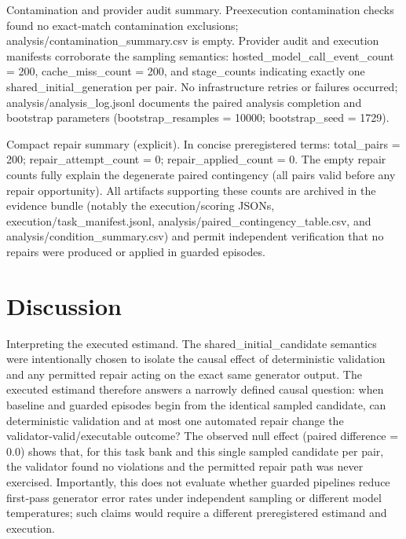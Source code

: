 \documentclass[conference]{IEEEtran}
\begin{document}
Contamination and provider audit summary. Preexecution contamination checks found no exact‑match contamination exclusions; analysis/contamination\_summary.csv is empty. Provider audit and execution manifests corroborate the sampling semantics: hosted\_model\_call\_event\_count = 200, cache\_miss\_count = 200, and stage\_counts indicating exactly one shared\_initial\_generation per pair. No infrastructure retries or failures occurred; analysis/analysis\_log.jsonl documents the paired analysis completion and bootstrap parameters (bootstrap\_resamples = 10000; bootstrap\_seed = 1729).

Compact repair summary (explicit). In concise preregistered terms: total\_pairs = 200; repair\_attempt\_count = 0; repair\_applied\_count = 0. The empty repair counts fully explain the degenerate paired contingency (all pairs valid before any repair opportunity). All artifacts supporting these counts are archived in the evidence bundle (notably the execution/scoring JSONs, execution/task\_manifest.jsonl, analysis/paired\_contingency\_table.csv, and analysis/condition\_summary.csv) and permit independent verification that no repairs were produced or applied in guarded episodes.

\section{Discussion}
Interpreting the executed estimand. The shared\_initial\_candidate semantics were intentionally chosen to isolate the causal effect of deterministic validation and any permitted repair acting on the exact same generator output. The executed estimand therefore answers a narrowly defined causal question: when baseline and guarded episodes begin from the identical sampled candidate, can deterministic validation and at most one automated repair change the validator‑valid/executable outcome? The observed null effect (paired difference = 0.0) shows that, for this task bank and this single sampled candidate per pair, the validator found no violations and the permitted repair path was never exercised. Importantly, this does not evaluate whether guarded pipelines reduce first‑pass generator error rates under independent sampling or different model temperatures; such claims would require a different preregistered estimand and execution.
\end{document}

